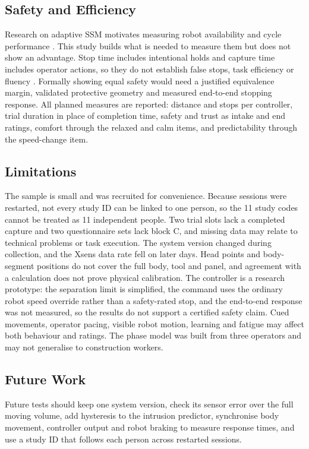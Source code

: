 \documentclass{IEEEtran}
\begin{document}
\subsection{Safety and Efficiency}
\label{sec:safety-eff}
Research on adaptive SSM motivates measuring robot availability and cycle
performance \cite{byner2019dynamic,karagiannis2022adaptive}. This study builds
what is needed to measure them but does not show an advantage. Stop time
includes intentional holds and capture time includes operator actions, so they
do not establish false stops, task efficiency or fluency
\cite{hoffman2019fluency}. Formally showing equal safety would need a
justified equivalence margin, validated protective geometry and measured
end-to-end stopping response. All planned measures are reported: distance and
stops per controller, trial duration in place of completion time, safety and
trust as intake and end ratings, comfort through the relaxed and calm items,
and predictability through the speed-change item.

\subsection{Limitations}
\label{sec:limitations}
The sample is small and was recruited for convenience. Because sessions were
restarted, not every study ID can be linked to one person, so the 11 study
codes cannot be treated as 11 independent people. Two trial slots lack a
completed capture and two questionnaire sets lack block C, and missing data may
relate to technical problems or task execution. The system version changed
during collection, and the Xsens data rate fell on later days. Head points and
body-segment positions do not cover the full body, tool and panel, and
agreement with a calculation does not prove physical calibration. The
controller is a research prototype: the separation limit is simplified, the
command uses the ordinary robot speed override rather than a safety-rated stop,
and the end-to-end response was not measured, so the results do not support a
certified safety claim. Cued movements, operator pacing, visible robot motion,
learning and fatigue may affect both behaviour and ratings. The phase model was
built from three operators and may not generalise to construction workers.

\subsection{Future Work}
Future tests should keep one system version, check its sensor error over the
full moving volume, add hysteresis to the intrusion predictor, synchronise body
movement, controller output and robot braking to measure response times, and
use a study ID that follows each person across restarted sessions.
\end{document}
